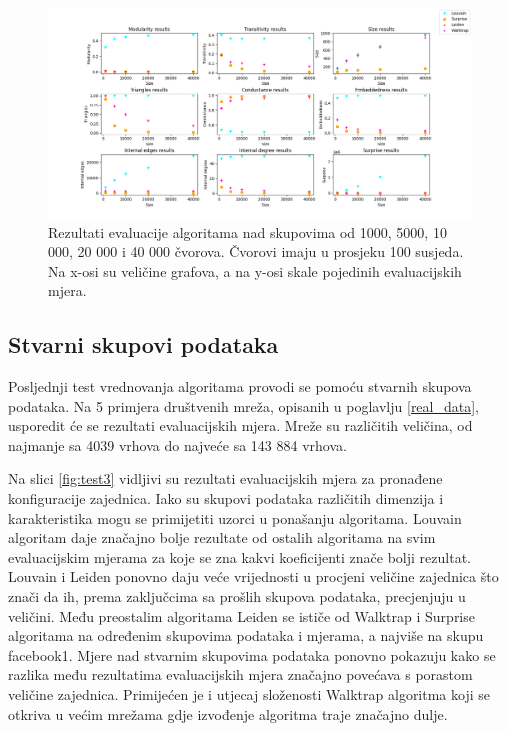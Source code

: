 \documentclass[times, utf8, diplomski]{fer}
\begin{document}
\begin{figure}
	\includegraphics[width=\linewidth]{images/test2_100.png}
	\caption{Rezultati evaluacije algoritama nad skupovima od 1000, 5000, 10 000, 20 000 i 40 000 čvorova. Čvorovi imaju u prosjeku 100 susjeda. Na x-osi su veličine grafova, a na y-osi skale pojedinih evaluacijskih mjera.}
	\label{fig:test2_100}
\end{figure}


\subsection{Stvarni skupovi podataka}

Posljednji test vrednovanja algoritama provodi se pomoću stvarnih skupova podataka. Na 5 primjera društvenih mreža, opisanih u poglavlju \ref{real_data}, usporedit će se rezultati evaluacijskih mjera. Mreže su različitih veličina, od najmanje sa 4039 vrhova do najveće sa 143 884 vrhova.

Na slici \ref{fig:test3} vidljivi su rezultati evaluacijskih mjera za pronađene konfiguracije zajednica. Iako su skupovi podataka različitih dimenzija i karakteristika mogu se primijetiti uzorci u ponašanju algoritama. Louvain algoritam daje značajno bolje rezultate od ostalih algoritama na svim evaluacijskim mjerama za koje se zna kakvi koeficijenti znače bolji rezultat. Louvain i Leiden ponovno daju veće vrijednosti u procjeni veličine zajednica što znači da ih, prema zaključcima sa prošlih skupova podataka, precjenjuju u veličini. Među preostalim algoritama Leiden se ističe od Walktrap i Surprise algoritama na određenim skupovima podataka i mjerama, a najviše na skupu facebook1. Mjere nad stvarnim skupovima podataka ponovno pokazuju kako se razlika među rezultatima evaluacijskih mjera značajno povećava s porastom veličine zajednica. Primijećen je i utjecaj složenosti Walktrap algoritma koji se otkriva u većim mrežama gdje izvođenje algoritma traje značajno dulje.
\end{document}
